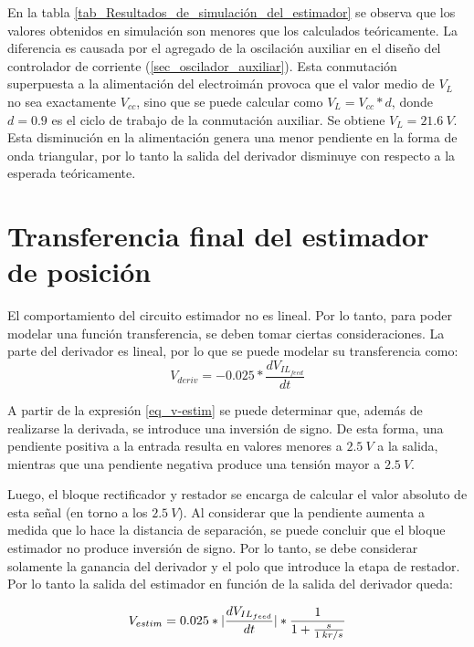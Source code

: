 En la tabla \ref{tab_Resultados_de_simulación_del_estimador} se observa que los valores obtenidos en simulación son menores que los calculados teóricamente. La diferencia es causada por el agregado de la oscilación auxiliar en el diseño del controlador de corriente (\ref{sec_oscilador_auxiliar}). Esta conmutación superpuesta a la alimentación del electroimán provoca que el valor medio de $V_L$ no sea exactamente $V_{cc}$, sino que se puede calcular como $V_L=V_{cc}*d$, donde $d=0.9$ es el ciclo de trabajo de la conmutación auxiliar. Se obtiene $V_L=21.6\:V$. Esta disminución en la alimentación genera una menor pendiente en la forma de onda triangular, por lo tanto la salida del derivador disminuye con respecto a la esperada teóricamente. 


\section{Transferencia final del estimador de posición}

El comportamiento del circuito estimador no es lineal.  Por lo tanto, para poder modelar una función transferencia, se deben tomar ciertas consideraciones. La parte del derivador es lineal, por lo que se puede modelar su transferencia como:
\begin{equation}\label{eq_v-estim}
	V_{deriv}=-0.025*\frac{dV_{IL_{feed}}}{dt} 
\end{equation}

A partir de la expresión \ref{eq_v-estim} se puede determinar que, además de realizarse la derivada, se introduce una inversión de signo. De esta forma, una pendiente positiva a la entrada resulta en valores menores a $2.5\:V$ a la salida, mientras que una pendiente negativa produce una tensión mayor a $2.5\:V$.

Luego, el bloque rectificador y restador se encarga de calcular el valor absoluto de esta señal (en torno a los $2.5\:V$). Al considerar que la pendiente aumenta a medida que lo hace la distancia de separación, se puede concluir que el bloque estimador no produce inversión de signo. Por lo tanto, se debe considerar solamente la ganancia del derivador y el polo que introduce la etapa de restador. Por lo tanto la salida del estimador en función de la salida del derivador queda:

\begin{equation} \label{eq_vestim_dvil}
	V_{estim}=0.025*\lvert\frac{dV_{IL_{feed}}}{dt}\rvert*\frac{1}{1+\frac{s}{1\:kr/s}} 
\end{equation}


